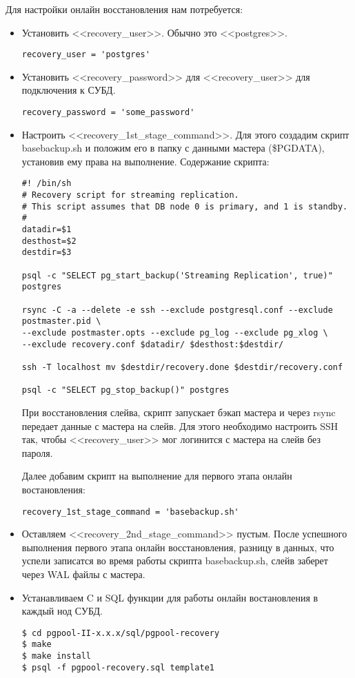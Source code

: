 Для настройки онлайн восстановления нам потребуется:
\begin{itemize}
\item Установить <<recovery\_user>>. Обычно это <<postgres>>.

\begin{lstlisting}[label=lst:pgpool42,caption=recovery\_user]
recovery_user = 'postgres'
\end{lstlisting}
\item Установить <<recovery\_password>> для <<recovery\_user>> для подключения к СУБД.

\begin{lstlisting}[label=lst:pgpool43,caption=recovery\_password]
recovery_password = 'some_password'
\end{lstlisting}

\item Настроить <<recovery\_1st\_stage\_command>>. Для этого создадим скрипт basebackup.sh 
и положим его в папку с данными мастера (\$PGDATA), установив ему права на выполнение.
Содержание скрипта:
\begin{lstlisting}[label=lst:pgpool44,caption=basebackup.sh]
#! /bin/sh
# Recovery script for streaming replication.
# This script assumes that DB node 0 is primary, and 1 is standby.
#
datadir=$1
desthost=$2
destdir=$3

psql -c "SELECT pg_start_backup('Streaming Replication', true)" postgres

rsync -C -a --delete -e ssh --exclude postgresql.conf --exclude postmaster.pid \
--exclude postmaster.opts --exclude pg_log --exclude pg_xlog \
--exclude recovery.conf $datadir/ $desthost:$destdir/

ssh -T localhost mv $destdir/recovery.done $destdir/recovery.conf

psql -c "SELECT pg_stop_backup()" postgres
\end{lstlisting}

При восстановления слейва, скрипт запускает бэкап мастера и через rsync передает данные с мастера на слейв. 
Для этого необходимо настроить SSH так, чтобы <<recovery\_user>> мог логинится с мастера на слейв без пароля.

Далее добавим скрипт на выполнение для первого этапа онлайн востановления:
\begin{lstlisting}[label=lst:pgpool45,caption=recovery\_1st\_stage\_command]
recovery_1st_stage_command = 'basebackup.sh'
\end{lstlisting}

\item Оставляем <<recovery\_2nd\_stage\_command>> пустым. После успешного выполнения первого этапа онлайн восстановления, 
разницу в данных, что успели записатся во время работы скрипта basebackup.sh, слейв заберет через WAL файлы с мастера.
\item Устанавливаем C и SQL функции для работы онлайн востановления в каждый нод СУБД.
\begin{lstlisting}[label=lst:pgpool46,caption=Устанавливаем C и SQL функции]
$ cd pgpool-II-x.x.x/sql/pgpool-recovery
$ make
$ make install
$ psql -f pgpool-recovery.sql template1
\end{lstlisting}
  

\end{itemize}
